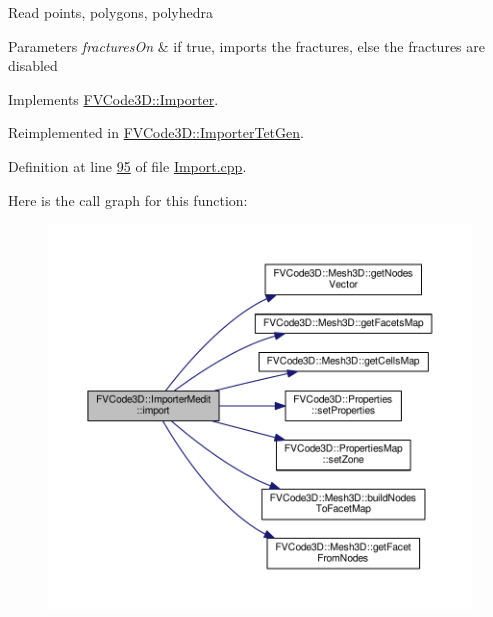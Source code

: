 Read points, polygons, polyhedra 
\begin{DoxyParams}{Parameters}
{\em fractures\+On} & if true, imports the fractures, else the fractures are disabled \\
\hline
\end{DoxyParams}


Implements \hyperlink{classFVCode3D_1_1Importer_aee8e68c30c3fd4a01f10a5a4365b30ea}{F\+V\+Code3\+D\+::\+Importer}.



Reimplemented in \hyperlink{classFVCode3D_1_1ImporterTetGen_a37d0191b42bbb7af28f5c42acb1185b7}{F\+V\+Code3\+D\+::\+Importer\+Tet\+Gen}.



Definition at line \hyperlink{Import_8cpp_source_l00095}{95} of file \hyperlink{Import_8cpp_source}{Import.\+cpp}.



Here is the call graph for this function\+:
\nopagebreak
\begin{figure}[H]
\begin{center}
\leavevmode
\includegraphics[width=350pt]{classFVCode3D_1_1ImporterMedit_a588447299960ebaf2f7583fe2ddecdcc_cgraph}
\end{center}
\end{figure}



